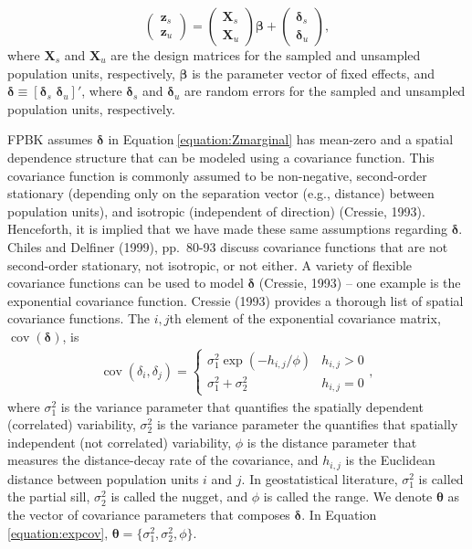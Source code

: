 \documentclass[]{elsarticle} %
\begin{document}
\begin{equation}
\begin{pmatrix} \label{equation:Zmarginal}
    \mathbf{z}_s      \\
    \mathbf{z}_u
\end{pmatrix}
=
\begin{pmatrix}
  \mathbf{X}_s    \\
  \mathbf{X}_u
\end{pmatrix}
\bm{\beta} +
\begin{pmatrix}
\bm{\delta}_s    \\
\bm{\delta}_u
\end{pmatrix},
\end{equation} where \(\mathbf{X}_s\) and \(\mathbf{X}_u\) are the
design matrices for the sampled and unsampled population units,
respectively, \(\bm{\beta}\) is the parameter vector of fixed effects,
and \(\bm{\delta} \equiv [\bm{\delta}_s \,\, \bm{\delta}_u]'\), where
\(\bm{\delta}_s\) and \(\bm{\delta}_u\) are random errors for the
sampled and unsampled population units, respectively.

FPBK assumes \(\bm{\delta}\) in Equation\(~\)\eqref{equation:Zmarginal}
has mean-zero and a spatial dependence structure that can be modeled
using a covariance function. This covariance function is commonly
assumed to be non-negative, second-order stationary (depending only on
the separation vector (e.g., distance) between population units), and
isotropic (independent of direction) (Cressie, 1993). Henceforth, it is
implied that we have made these same assumptions regarding
\(\bm{\delta}\). Chiles and Delfiner (1999), pp.~80-93 discuss
covariance functions that are not second-order stationary, not
isotropic, or not either. A variety of flexible covariance functions can
be used to model \(\bm{\delta}\) (Cressie, 1993) -- one example is the
exponential covariance function. Cressie (1993) provides a thorough list
of spatial covariance functions. The \(i,j\)th element of the
exponential covariance matrix, \(\mathop{\mathrm{{cov}}}(\bm{\delta})\),
is \mbox{} \begin{align}\label{equation:expcov}
\mathop{\mathrm{{cov}}}(\delta_i, \delta_j) = 
\begin{cases} 
\sigma^2_{1}\exp(-h_{i,j}/\phi) & h_{i,j} > 0 \\
\sigma^2_{1} + \sigma^2_2 & h_{i,j} = 0
\end{cases}
,
\end{align} where \(\sigma^2_{1}\) is the variance parameter that
quantifies the spatially dependent (correlated) variability,
\(\sigma^2_{2}\) is the variance parameter the quantifies that spatially
independent (not correlated) variability, \(\phi\) is the distance
parameter that measures the distance-decay rate of the covariance, and
\(h_{i,j}\) is the Euclidean distance between population units \(i\) and
\(j\). In geostatistical literature, \(\sigma^2_{1}\) is called the
partial sill, \(\sigma^2_{2}\) is called the nugget, and \(\phi\) is
called the range. We denote \(\bm{\theta}\) as the vector of covariance
parameters that composes \(\bm{\delta}\). In
Equation\(~\)\ref{equation:expcov},
\(\bm{\theta} = \{\sigma^2_1, \sigma^2_2, \phi \}\).
\end{document}
